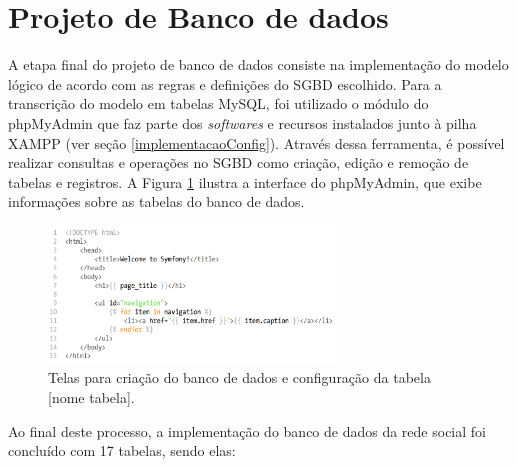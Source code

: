 \section{Projeto de Banco de dados}
\label{metodologiaBD}

A etapa final do projeto de banco de dados consiste na implementação do modelo lógico de acordo com as regras e definições do SGBD escolhido. Para a transcrição do modelo em tabelas MySQL, foi utilizado o módulo do phpMyAdmin que faz parte dos \textit{softwares} e recursos instalados junto à pilha XAMPP (ver seção \ref{implementacaoConfig}). Através dessa ferramenta, é possível realizar consultas e  operações no SGBD como criação, edição e remoção de tabelas e registros. A Figura \ref{projetoImagens} ilustra a interface do phpMyAdmin, que exibe informações sobre as tabelas do banco de dados.

\begin{figure}[h]
    \begin{adjustwidth}{-1in}{-.8in}
        \begin{center}
            \includegraphics[width=0.68\textwidth]{figuras/twig-symf.png}
        \end{center}
        \caption{Telas para criação do banco de dados e configuração da tabela [nome tabela].}
        \label{projetoImagens}
    \end{adjustwidth}
\end{figure}

Ao final deste processo, a implementação do banco de dados da rede social foi concluído com 17 tabelas, sendo elas:

